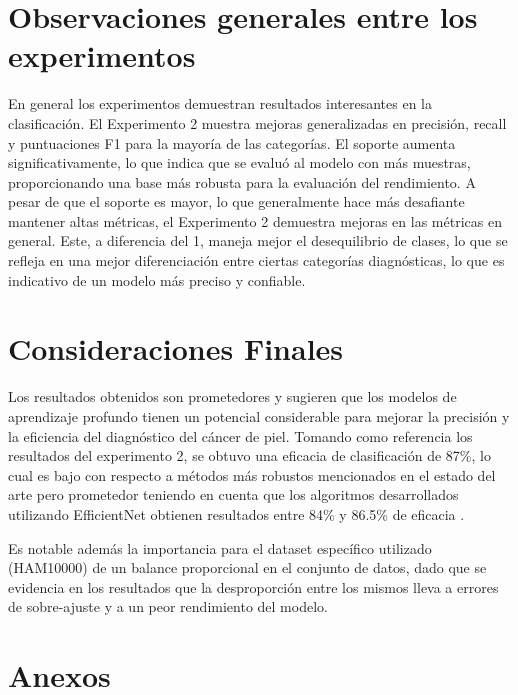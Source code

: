 \section*{Observaciones generales entre los experimentos}

En general los experimentos demuestran resultados interesantes en la clasificación. El Experimento 2 muestra mejoras generalizadas en precisión, recall y puntuaciones F1 para la mayoría de las categorías. El soporte aumenta significativamente, lo que indica que se evaluó al modelo con más muestras, proporcionando una base más robusta para la evaluación del rendimiento. A pesar de que el soporte es mayor, lo que generalmente hace más desafiante mantener altas métricas, el Experimento 2 demuestra mejoras en las métricas en general. Este, a diferencia del 1, maneja mejor el desequilibrio de clases, lo que se refleja en una mejor diferenciación entre ciertas categorías diagnósticas, lo que es indicativo de un modelo más preciso y confiable.

\section{Consideraciones Finales}\label{subsubsec:final_considerations}

Los resultados obtenidos son prometedores y sugieren que los modelos de aprendizaje profundo tienen un potencial considerable para mejorar la precisión y la eficiencia del diagnóstico del cáncer de piel. Tomando como referencia los resultados del experimento 2, se obtuvo una eficacia de clasificación de 87\%, lo cual es bajo con respecto a métodos más robustos mencionados en el estado del arte pero prometedor teniendo en cuenta que los algoritmos desarrollados utilizando EfficientNet obtienen resultados entre 84\% y 86.5\% de eficacia .

Es notable además la importancia para el dataset específico utilizado (HAM10000) de un balance proporcional en el conjunto de datos, dado que se evidencia en los resultados que la desproporción entre los mismos lleva a errores de sobre-ajuste y a un peor rendimiento del modelo.

\section*{Anexos}

